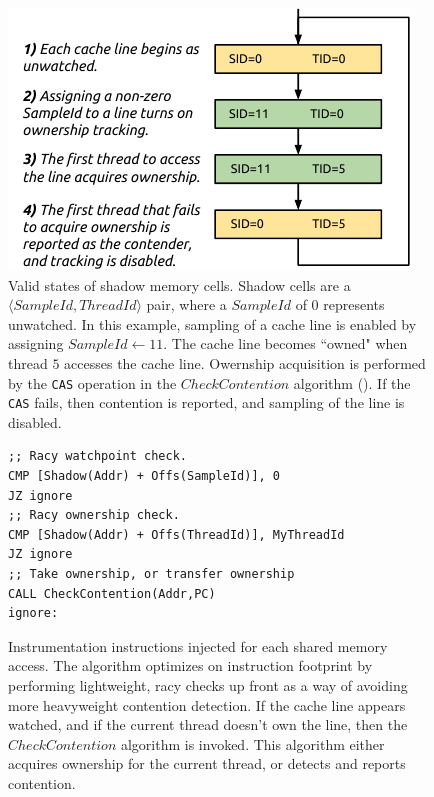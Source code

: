 \documentclass[letterpaper,twocolumn,10pt]{article}
\begin{document}
\begin{figure}[t]
\begin{center}
\includegraphics{states.pdf}
\end{center}
\caption{\label{fig:states_of_shadow}Valid states of shadow memory cells. Shadow cells are a $\langle SampleId,ThreadId \rangle$ %
pair, where a $SampleId$ of $0$ represents unwatched. In this example, sampling of a cache line is enabled by assigning %
$SampleId \gets 11$. The cache line becomes ``owned" when thread $5$ accesses the cache line. Owernship acquisition is %
performed by the \texttt{CAS} operation in the $CheckContention$ algorithm (). If the \texttt{CAS} fails, %
then contention is reported, and sampling of the line is disabled.}
%
\end{figure}

\begin{figure}[t]
\lstset{language=[x64]Assembler}
\begin{lstlisting}[basicstyle=\footnotesize\ttfamily]
;; Racy watchpoint check.
CMP [Shadow(Addr) + Offs(SampleId)], 0
JZ ignore
;; Racy ownership check.
CMP [Shadow(Addr) + Offs(ThreadId)], MyThreadId
JZ ignore
;; Take ownership, or transfer ownership
CALL CheckContention(Addr,PC)
ignore:
\end{lstlisting}
\caption{\label{fig:inline_assembly}Instrumentation instructions injected for each shared memory access. The algorithm %
optimizes on instruction footprint by performing lightweight, racy checks up front as a way of avoiding more heavyweight %
contention detection. If the cache line appears watched, and if the current thread doesn't own the line, then the %
$CheckContention$ algorithm is invoked. This algorithm either acquires ownership for the current thread, or detects and %
reports contention.}
\end{figure}
\end{document}
